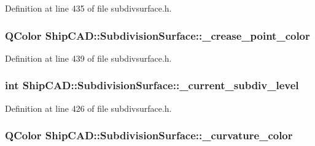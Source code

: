 Definition at line 435 of file subdivsurface.\+h.

\subsubsection[{\texorpdfstring{\+\_\+crease\+\_\+point\+\_\+color}{_crease_point_color}}]{\setlength{\rightskip}{0pt plus 5cm}Q\+Color Ship\+C\+A\+D\+::\+Subdivision\+Surface\+::\+\_\+crease\+\_\+point\+\_\+color\hspace{0.3cm}{\ttfamily [protected]}}\hypertarget{classShipCAD_1_1SubdivisionSurface_a9602182d9a123dc267d34a2cd1b45ed7}{}\label{classShipCAD_1_1SubdivisionSurface_a9602182d9a123dc267d34a2cd1b45ed7}


Definition at line 439 of file subdivsurface.\+h.

\subsubsection[{\texorpdfstring{\+\_\+current\+\_\+subdiv\+\_\+level}{_current_subdiv_level}}]{\setlength{\rightskip}{0pt plus 5cm}int Ship\+C\+A\+D\+::\+Subdivision\+Surface\+::\+\_\+current\+\_\+subdiv\+\_\+level\hspace{0.3cm}{\ttfamily [protected]}}\hypertarget{classShipCAD_1_1SubdivisionSurface_a9e5424746eced5d0a06ccbe4055bd06f}{}\label{classShipCAD_1_1SubdivisionSurface_a9e5424746eced5d0a06ccbe4055bd06f}


Definition at line 426 of file subdivsurface.\+h.

\subsubsection[{\texorpdfstring{\+\_\+curvature\+\_\+color}{_curvature_color}}]{\setlength{\rightskip}{0pt plus 5cm}Q\+Color Ship\+C\+A\+D\+::\+Subdivision\+Surface\+::\+\_\+curvature\+\_\+color\hspace{0.3cm}{\ttfamily [protected]}}\hypertarget{classShipCAD_1_1SubdivisionSurface_a05a83d21996abb065abe7f3109f35a73}{}\label{classShipCAD_1_1SubdivisionSurface_a05a83d21996abb065abe7f3109f35a73}


